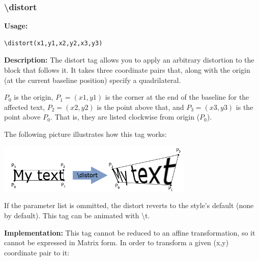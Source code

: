 \documentclass{spec}
\begin{document}
\subsubsection{\textbackslash distort}

\textbf{Usage:}
\begin{verbatim}
\distort(x1,y1,x2,y2,x3,y3)
\end{verbatim}

\textbf{Description:}
The distort tag allows you to apply an arbitrary distortion to the block that follows it.
It takes three coordinate pairs that, along with the origin (at the current baseline position)
specify a quadrilateral.

$P_0$ is the origin, $P_1 = (x1,y1)$ is the corner at the end of the baseline for the affected text,
$P_2 = (x2,y2)$ is the point above that, and $P_3 = (x3,y3)$ is the point above $P_0$. That is, they
are listed clockwise from origin ($P_0$).

The following picture illustrates how this tag works:\\
\begin{center}
\includegraphics[width=0.7\textwidth]{./distort}
\end{center}

If the parameter list is ommitted, the distort reverts to the style's default (none by default).
This tag can be animated with \textbackslash t.

\textbf{Implementation:}
This tag cannot be reduced to an affine transformation, so it cannot be expressed in Matrix form.
In order to transform a given (x,y) coordinate pair to it:
\end{document}
